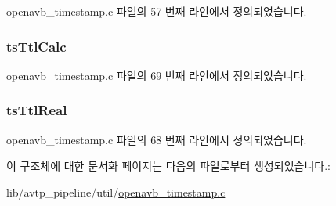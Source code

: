 openavb\+\_\+timestamp.\+c 파일의 57 번째 라인에서 정의되었습니다.

\subsubsection[{\texorpdfstring{ts\+Ttl\+Calc}{tsTtlCalc}}]{ ts\+Ttl\+Calc}\hypertarget{structopenavb__timestamp__eval_a6f760ec3192bb0002bd92a5bff3e9367}{}\label{structopenavb__timestamp__eval_a6f760ec3192bb0002bd92a5bff3e9367}


openavb\+\_\+timestamp.\+c 파일의 69 번째 라인에서 정의되었습니다.

\subsubsection[{\texorpdfstring{ts\+Ttl\+Real}{tsTtlReal}}]{ ts\+Ttl\+Real}\hypertarget{structopenavb__timestamp__eval_a5cb94701ae677c7fb2f21313976a1c67}{}\label{structopenavb__timestamp__eval_a5cb94701ae677c7fb2f21313976a1c67}


openavb\+\_\+timestamp.\+c 파일의 68 번째 라인에서 정의되었습니다.



이 구조체에 대한 문서화 페이지는 다음의 파일로부터 생성되었습니다.\+:\begin{DoxyCompactItemize}
\item 
lib/avtp\+\_\+pipeline/util/\hyperlink{openavb__timestamp_8c}{openavb\+\_\+timestamp.\+c}\end{DoxyCompactItemize}
